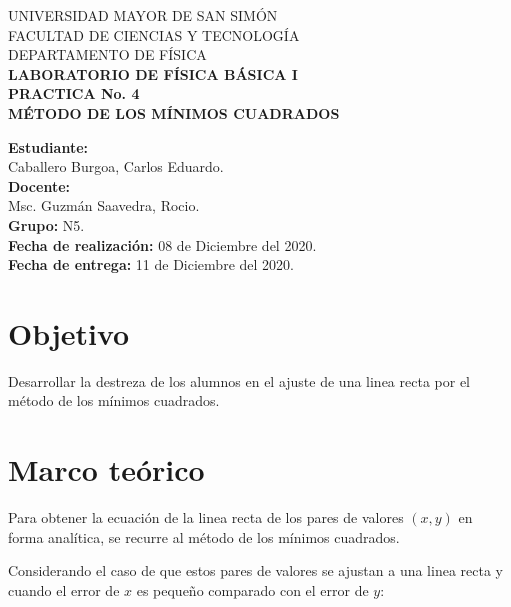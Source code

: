 \documentclass[letter,11pt]{article}
\newcommand{\blankpage}{
\newpage
\thispagestyle{empty}
\mbox{}
\newpage
}
\begin{document}
\begin{titlepage}
\begin{center}
{\Large UNIVERSIDAD MAYOR DE SAN SIMÓN}\\
\vspace*{0.15cm}
{\large FACULTAD DE CIENCIAS Y TECNOLOGÍA}\\
\vspace*{0.10cm}
DEPARTAMENTO DE FÍSICA\\
\vspace*{3.0cm}
{\Large \textbf{LABORATORIO DE FÍSICA BÁSICA I}}\\
\vspace*{0.3cm}
{\Large \textbf{PRACTICA No. 4}}\\
\vspace*{3.5cm}
{\Large \textbf{MÉTODO DE LOS MÍNIMOS CUADRADOS}}\\
\end{center}

\vspace*{7.4cm}
\leftskip=7.95cm
\noindent
\textbf{Estudiante:}\\
Caballero Burgoa, Carlos Eduardo.\\
\newline
\textbf{Docente:}\\
Msc. Guzmán Saavedra, Rocio.\\
\newline
\textbf{Grupo:} N5.\\
\textbf{Fecha de realización:} 08 de Diciembre del 2020.\\
\textbf{Fecha de entrega:} 11 de Diciembre del 2020.\\

\end{titlepage}

\blankpage

\section{Objetivo}
Desarrollar la destreza de los alumnos en el ajuste de una linea recta por el
método de los mínimos cuadrados.

\section{Marco teórico}
Para obtener la ecuación de la linea recta de los pares de valores $(x,y)$ en
forma analítica, se recurre al método de los mínimos cuadrados.

Considerando el caso de que estos pares de valores se ajustan a una linea recta
y cuando el error de $x$ es pequeño comparado con el error de $y$:
\end{document}
